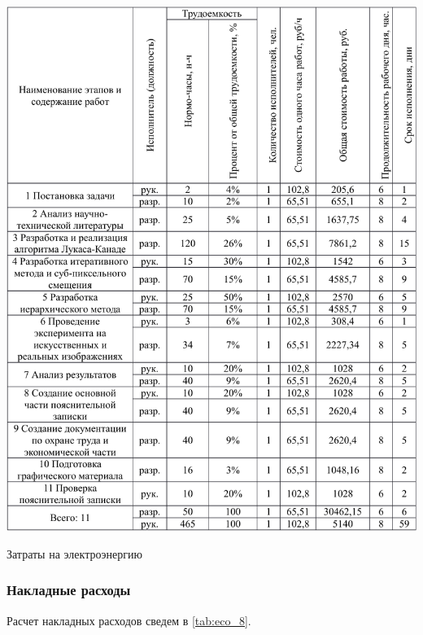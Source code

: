 \begin{table}[h!]
\centering
\includegraphics[page=7, width=0.9\linewidth]{econom_table.pdf}
\caption{Затраты на электроэнергию}
\label{tab:eco_7}
\end{table}

\subsubsection{Накладные расходы}

Расчет накладных расходов сведем в \ref{tab:eco_8}.


